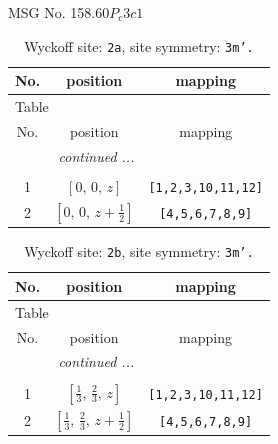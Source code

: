 \documentclass[fleqn,8pt]{jsarticle}
\begin{document}
\setcounter{MaxMatrixCols}{32}

\renewcommand{\tablename}{Table~}
\renewcommand{\figurename}{Figure~}
\begin{center}
\LARGE
MSG No. 158.60\quad$P_{c}3c1$
\end{center}
\renewcommand{\arraystretch}{1.2}
\begin{longtable}{ccc}
\caption{Wyckoff site: {\tt 2a}, site symmetry: {\tt 3m'.}}
 \\
 \hline \hline
No. & position & mapping \\ \hline \endfirsthead

\multicolumn{2}{l}{\tablename\ \thetable{}} \\
 \hline \hline
No. & position & mapping \\ \hline \endhead

 \hline \hline
\multicolumn{2}{r}{\footnotesize\it continued ...} \\ \endfoot

 \hline \hline
\multicolumn{2}{r}{} \\ \endlastfoot

1 & $\left[ 0,\, 0,\, z \right]$ & {\tt [1,2,3,10,11,12]} \\ \hline
2 & $\left[ 0,\, 0,\, z + \frac{1}{2} \right]$ & {\tt [4,5,6,7,8,9]} \\
\end{longtable}
\renewcommand{\arraystretch}{1.2}
\begin{longtable}{ccc}
\caption{Wyckoff site: {\tt 2b}, site symmetry: {\tt 3m'.}}
 \\
 \hline \hline
No. & position & mapping \\ \hline \endfirsthead

\multicolumn{2}{l}{\tablename\ \thetable{}} \\
 \hline \hline
No. & position & mapping \\ \hline \endhead

 \hline \hline
\multicolumn{2}{r}{\footnotesize\it continued ...} \\ \endfoot

 \hline \hline
\multicolumn{2}{r}{} \\ \endlastfoot

1 & $\left[ \frac{1}{3},\, \frac{2}{3},\, z \right]$ & {\tt [1,2,3,10,11,12]} \\ \hline
2 & $\left[ \frac{1}{3},\, \frac{2}{3},\, z + \frac{1}{2} \right]$ & {\tt [4,5,6,7,8,9]} \\
\end{longtable}
\end{document}
